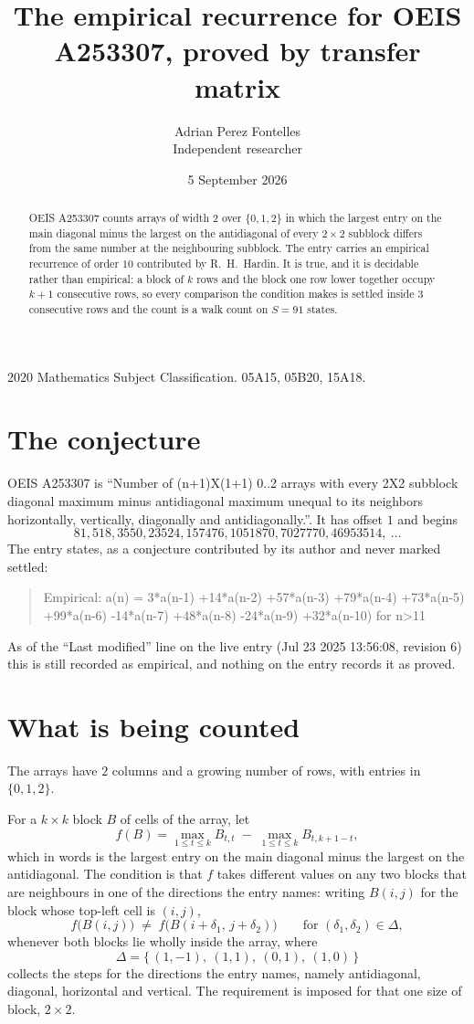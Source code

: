 \documentclass[11pt,a4paper]{article}
\title{The empirical recurrence for OEIS A253307, proved by transfer matrix}
\author{Adrian Perez Fontelles\\ \small Independent researcher}
\date{5 September 2026}
\theoremstyle{plain}
\theoremstyle{definition}
\begin{document}
\maketitle

\begin{abstract}
OEIS A253307 counts arrays of width $2$ over $\{0,1,2\}$ in which the largest entry on the main diagonal minus the largest on the antidiagonal of every $2\times2$ subblock differs from the same number at the neighbouring subblock. The entry carries an
empirical recurrence of order $10$ contributed by R.~H.~Hardin. It is true, and it is
decidable rather than empirical: a block of $k$ rows and the block one row lower together
occupy $k+1$ consecutive rows, so every comparison the condition makes is settled inside
$3$ consecutive rows and the count is a walk count on $S=91$ states.
\end{abstract}

\noindent\small 2020 Mathematics Subject Classification. 05A15, 05B20, 15A18.\normalsize

\section{The conjecture}

OEIS A253307 is ``Number of (n+1)X(1+1) 0..2 arrays with every 2X2 subblock diagonal maximum minus antidiagonal maximum unequal to its neighbors horizontally, vertically, diagonally and antidiagonally.''. It has offset $1$ and begins
\[
81, 518, 3550, 23524, 157476, 1051870, 7027770, 46953514,\ \dots
\]
The entry states, as a conjecture contributed by its author and never marked settled:
\begin{quote}
Empirical: a(n) = 3*a(n-1) +14*a(n-2) +57*a(n-3) +79*a(n-4) +73*a(n-5) +99*a(n-6) -14*a(n-7) +48*a(n-8) -24*a(n-9) +32*a(n-10) for n>11
\end{quote}
As of the ``Last modified'' line on the live entry (Jul 23 2025 13:56:08, revision 6) this is still
recorded as empirical, and nothing on the entry records it as proved.

\section{What is being counted}

The arrays have $2$ columns and a growing number of rows, with entries in $\{0,1,2\}$.

For a $k\times k$ block $B$ of cells of the array, let
\[
f(B)=\max_{1\le t\le k}B_{t,t}\;-\;\max_{1\le t\le k}B_{t,k+1-t} ,
\]
which in words is the largest entry on the main diagonal minus the largest on the antidiagonal. The condition is that $f$ takes different values on any two blocks that
are neighbours in one of the directions the entry names: writing $B(i,j)$ for the block whose
top-left cell is $(i,j)$,
\[
f\bigl(B(i,j)\bigr)\;\neq\;f\bigl(B(i+\delta_1,\,j+\delta_2)\bigr)
\qquad\text{for }(\delta_1,\delta_2)\in\Delta,
\]
whenever both blocks lie wholly inside the array, where
\[
\Delta=\{\,(1,-1),\ (1,1),\ (0,1),\ (1,0)\,\}
\]
collects the steps for the directions the entry names, namely antidiagonal, diagonal, horizontal and vertical. The
requirement is imposed for that one size of block, $2\times2$.
\end{document}
